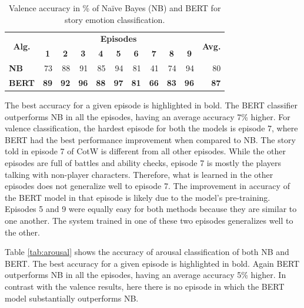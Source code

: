 \begin{table}[t!]
\centering
\setlength{\tabcolsep}{4pt}
\begin{tabular}{crrrrrrrrrr}
\toprule
\multirow{2}{*}{\textbf{Alg.}} & \multicolumn{9}{c}{\textbf{Episodes}} & \multirow{2}{*}{\textbf{Avg.}} \\
\cmidrule{2-10}
& \multicolumn{1}{c}{\textbf{1}}   & \multicolumn{1}{c}{\textbf{2}}   & \multicolumn{1}{c}{\textbf{3}}  & \multicolumn{1}{c}{\textbf{4}} & \multicolumn{1}{c}{\textbf{5}}  & \multicolumn{1}{c}{\textbf{6}}  & \multicolumn{1}{c}{\textbf{7}} & \multicolumn{1}{c}{\textbf{8}}  & \multicolumn{1}{c}{\textbf{9}} &    \\
\midrule
\multicolumn{1}{l}{\textbf{NB}}   &   73 & 88  &  91 & 85   &  94 & 81  &  41 & 74   & 94    &   80 \\
\multicolumn{1}{l}{\textbf{BERT}}   &  \textbf{89}  & \textbf{92}  & \textbf{96}  &  \textbf{88} & \textbf{97}   & \textbf{81} & \textbf{66}   &  \textbf{83}   &  \textbf{96} &  \textbf{87}  \\
\bottomrule
\end{tabular}
\caption{Valence accuracy in \% of Na\"ive Bayes (NB) and BERT for story emotion classification.}
\label{tab:valence}
\end{table}

The best accuracy for a given episode is highlighted in bold. The BERT classifier outperforms NB in all the episodes, having an average accuracy 7\% higher. For valence classification, the hardest episode for both the models is episode 7, where BERT had the best performance improvement when compared to NB. The story told in episode 7 of CotW is different from all other episodes. While the other episodes are full of battles and ability checks, episode 7 is mostly the players talking with non-player characters. Therefore, what is learned in the other episodes does not generalize well to episode 7. The improvement in accuracy of the BERT model in that episode is likely due to the model's pre-training. Episodes 5 and 9 were equally easy for both methods because they are similar to one another. The system trained in one of these two episodes generalizes well to the other.

Table \ref{tab:arousal} shows the accuracy of arousal classification of both NB and BERT. The best accuracy for a given episode is highlighted in bold. Again BERT outperforms NB in all the episodes, having an average accuracy 5\% higher. In contrast with the valence results, here there is no episode in which the BERT model substantially outperforms NB.

